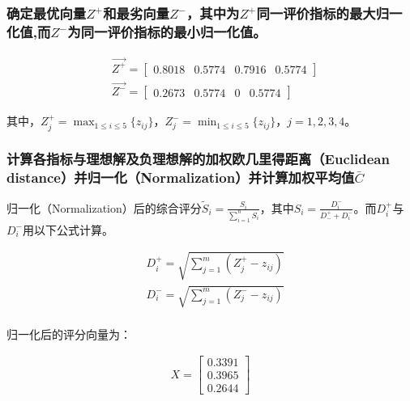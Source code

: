 \documentclass[
  journal=,
  manuscript=,
  year=2022,
  volume=01,
]{cup-journal}
\begin{document}
\subsubsection{确定最优向量$Z^{+}$和最劣向量$Z^{-}$，其中为$Z^{+}$同一评价指标的最大归一化值,而$Z^{-}$为同一评价指标的最小归一化值。}

\begin{equation}
	\begin{aligned}
		& \overrightarrow{Z^{+}}=\begin{bmatrix}
			0.8018 & 0.5774 & 0.7916 & 0.5774
		\end{bmatrix}\\
		& \overrightarrow{Z^{-}}=\begin{bmatrix}
			0.2673 & 0.5774 & 0 & 0.5774
		\end{bmatrix}
	\end{aligned}
\end{equation}

\par 其中，$Z_{j}^{+}=\max_{1\le i \le 5}\{z_{ij}\}$，$Z_{j}^{-}=\min_{1\le i \le 5}\{z_{ij}\}$，$j=1,2,3,4$。

\subsubsection{计算各指标与理想解及负理想解的加权欧几里得距离（Euclidean distance）并归一化（Normalization）并计算加权平均值$\bar{C}$}

\par 归一化（Normalization）后的综合评分$\tilde{S}_{i}=\frac{S_{i}}{\sum_{i=1}^{n}S_{i}}$，其中$S_{i}=\frac{D^{-}_{i}}{D^{+}_{-}+D^{-}_{i}}$。而$D^{+}_{i}$与$D^{-}_{i}$用以下公式计算。

\begin{equation}
	\begin{aligned}
		& D^{+}_{i} = \sqrt{\sum_{j=1}^{m}(Z^{+}_{j}-z_{ij})}\\
		& D^{-}_{i} = \sqrt{\sum_{j=1}^{m}(Z^{-}_{j}-z_{ij})} \\
	\end{aligned}
\end{equation}

\par 归一化后的评分向量为：

\begin{equation}
	\begin{aligned}
		X=
		\begin{bmatrix}
			0.3391 \\
			0.3965 \\
			0.2644
		\end{bmatrix}
	\end{aligned}
\end{equation}
\end{document}
